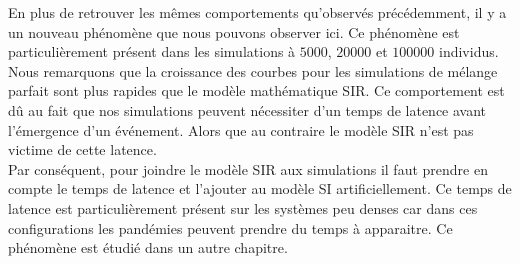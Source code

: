 En plus de retrouver les mêmes comportements qu'observés précédemment, il y a un nouveau phénomène que nous pouvons observer ici. Ce phénomène est particulièrement présent dans les simulations à $5000$, $20000$ et $100000$ individus. Nous remarquons que la croissance des courbes pour les simulations de mélange parfait sont plus rapides que le modèle mathématique SIR. Ce comportement est dû au fait que nos simulations peuvent nécessiter d'un temps de latence avant l'émergence d'un événement. Alors que au contraire le modèle SIR n'est pas victime de cette latence.\\

Par conséquent, pour joindre le modèle SIR aux simulations il faut prendre en compte le temps de latence et l'ajouter au modèle SI artificiellement. Ce temps de latence est particulièrement présent sur les systèmes peu denses car dans ces configurations les pandémies peuvent prendre du temps à apparaitre. Ce phénomène est étudié dans un autre chapitre.

\newpage

